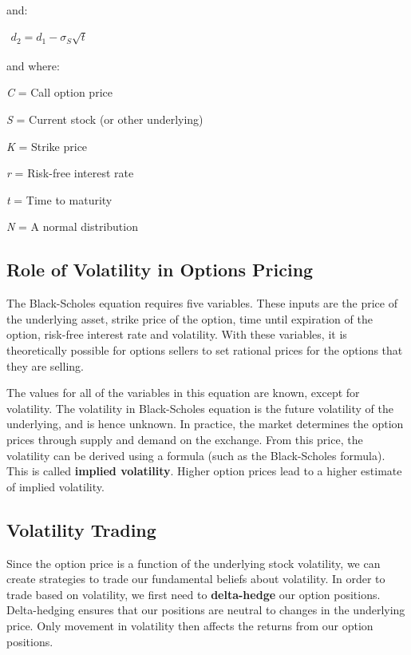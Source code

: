 \documentclass[10pt]{article}
\theoremstyle{definition}
\begin{document}
and:

\begin{center} 
$
\begin{matrix}
d_2 = d_1-\sigma_S \sqrt t
\end{matrix}
$
\end{center}

and where:

\emph{C} = Call option price

\emph{S} = Current stock (or other underlying)

\emph{K} = Strike price 

\emph{r} = Risk-free interest rate 

\emph{t} = Time to maturity 

\emph{N} = A normal distribution



\subsection{Role of Volatility in Options Pricing}
The Black-Scholes equation requires five variables. These inputs are the price of the underlying asset, strike price of the option, time until expiration of the option, risk-free interest rate and volatility. With these variables, it is theoretically possible for options sellers to set rational prices for the options that they are selling. 

The values for all of the variables in this equation are known, except for volatility. The volatility in Black-Scholes equation is the future volatility of the underlying, and is hence unknown. In practice, the market determines the option prices through supply and demand on the exchange. From this price,
the volatility can be derived using a formula (such as the Black-Scholes formula). This is called \textbf{implied volatility}. Higher option prices lead to a higher estimate of implied volatility.


\subsection{Volatility Trading}

Since the option price is a function of the underlying stock volatility, we can create strategies to trade our fundamental beliefs about volatility. In order to trade based on volatility, we first need to \textbf{delta-hedge} our option positions. Delta-hedging ensures that our positions are neutral to changes in the underlying price. Only movement in volatility then affects the returns from our option positions. 
\end{document}
